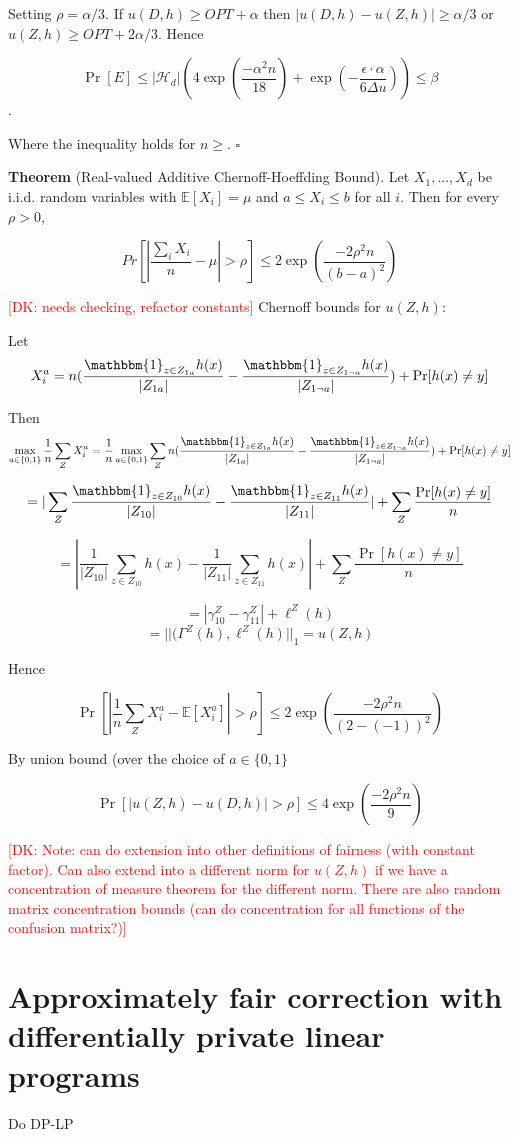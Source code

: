 \documentclass[format = sigconf]{acmart}
\newcommand{\dk}[1]{\textcolor{red}{[DK: #1]}}
\renewcommand{\H}{\mathcal{H}}
\newcommand{\1}{\mathbbm{1}}
\theoremstyle{definition}
\begin{document}
Setting $\rho = \alpha/3$. If $u(D,h) \geq OPT + \alpha$ then $|u(D,h) - u(Z,h)| \geq \alpha/3$ or $u(Z,h) \geq OPT + 2\alpha/3$. Hence

$$\Pr[E] \leq |\H_d|(4\exp(\frac{-\alpha^2n}{18}) + \exp(-\frac{\epsilon\cdot\alpha}{6\Delta u})) \leq \beta$$.

Where the inequality holds for $n \geq $. $\square$

{\bf Theorem} (Real-valued Additive Chernoff-Hoeffding Bound). Let $X_1,...,X_d$ be i.i.d. random variables with $\mathbb{E}[X_i] = \mu$ and $a \leq X_i \leq b$ for all $i$. Then for every $\rho > 0$,

$$Pr[|\frac{\sum_i X_i}{n} - \mu| > \rho] \leq 2\exp(\frac{-2\rho^2n}{(b-a)^2})$$

\dk {needs checking, refactor constants}
Chernoff bounds for $u(Z,h)$:

Let $$X_i^a = n(\frac{\1_{z\in Z_{1a}}h(x)}{|Z_{1a}|} - \frac{\1_{z\in Z_{1\neg a}}h(x)}{|Z_{1 \neg a}|} ) + \Pr[h(x) \neq y]$$

Then $$\max_{a\in \{0,1\}}\frac{1}{n} \sum_Z X_i^a =\frac{1}{n}  \max_{a\in \{0,1\}} \sum_Z n(\frac{\1_{z\in Z_{1a}}h(x)}{|Z_{1a}|} - \frac{\1_{z\in Z_{1\neg a}}h(x)}{|Z_{1 \neg a}|} ) + \Pr[h(x) \neq y]$$

$$= |\sum_Z \frac{\1_{z\in Z_{10}}h(x)}{|Z_{10}|} - \frac{\1_{z\in Z_{11}}h(x)}{|Z_{11}|}| +  \sum_Z \frac{\Pr[h(x) \neq y] }{n}$$

$$= |\frac{1}{|Z_{10}|} \sum_{z\in Z_{10}} h(x) - \frac{1}{|Z_{11}|} \sum_{z\in Z_{11}} h(x)| +  \sum_Z \frac{\Pr[h(x) \neq y] }{n}$$

$$=|\gamma_{10}^Z - \gamma_{11}^Z| + \ell^Z(h) $$
$$=||(\Gamma^Z(h), \ell^Z(h)||_{1} = u(Z,h)$$

Hence

$$\Pr[|\frac{1}{n} \sum_Z X_i^a - \mathbb{E}[X_i^a]| > \rho] \leq 2\exp(\frac{-2\rho^2n}{(2-(-1))^2})$$

By union bound (over the choice of $a \in \{0,1\}$

$$\Pr[|u(Z,h) - u(D,h)| > \rho] \leq 4\exp(\frac{-2\rho^2n}{9})$$

\dk {Note: can do extension into other definitions of fairness (with constant factor).
Can also extend into a different norm for $u(Z,h)$ if we have a concentration of measure theorem for the different norm. There are also random matrix concentration bounds (can do concentration for all functions of the confusion matrix?)}

\section{Approximately fair correction with differentially private linear programs}
Do DP-LP
\end{document}
